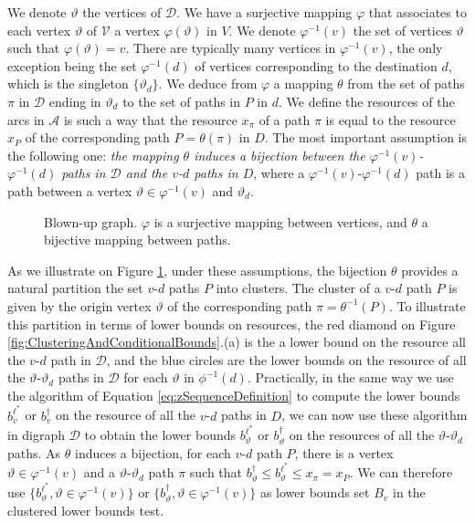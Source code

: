 \documentclass[11pt]{amsart}
\theoremstyle{plain}
\theoremstyle{remark}
\newcommand{\rleq}{\leqslant}
\newcommand{\re}{x}
\begin{document}
We denote  $\vartheta$ the vertices of $\mathcal{D}$. We have a surjective mapping $\varphi$ that associates to each vertex $\vartheta$ of $\mathcal{V}$ a vertex $\varphi(\vartheta)$ in $V$. We denote $\varphi^{-1}(v)$ the set of vertices $\vartheta$ such that $\varphi(\vartheta) = v$. There are typically many vertices in $\varphi^{-1}(v)$, the only exception being the set $\varphi^{-1}(d) $ of vertices corresponding to the destination $d$, which is the singleton $ \{\vartheta_{d}\}$. We deduce from $\varphi$ a mapping $\theta$ from the set of paths $\pi$ in $\mathcal{D}$ ending in $\vartheta_{d}$ to the set of paths in $P$ in $d$. We define the resources of the arcs in $\mathcal{A}$ is such a way that the resource $\re_{\pi}$ of a path $\pi$ is equal to the resource $\re_{P}$ of the corresponding path $P = \theta(\pi)$ in $D$. The most important assumption is the following one: \emph{the mapping $\theta$ induces a bijection between the $\varphi^{-1}(v)$-$\varphi^{-1}(d)$ paths in $\mathcal{D}$ and the $v$-$d$ paths in $D$}, where a $\varphi^{-1}(v)$-$\varphi^{-1}(d)$ path is a path between a vertex $\vartheta \in \varphi^{-1}(v)$ and $\vartheta_{d}$.


\begin{figure}[!ht]
	\begin{center}
		
		\caption{Blown-up graph. $\varphi$ is a surjective mapping between vertices, and $\theta$ a bijective mapping between paths.}
		\label{fig:stateGraph1}
	\end{center}
\end{figure} 

As we illustrate on Figure \ref{fig:stateGraph1}, under these assumptions, the bijection $\theta$ provides a natural partition the set $v$-$d$ paths $P$ into clusters. The cluster of a $v$-$d$ path $P$ is given by the origin vertex $\vartheta$ of the corresponding path $\pi = \theta^{-1}(P)$. To illustrate this partition in terms of lower bounds on resources, the red diamond on Figure \ref{fig:ClusteringAndConditionalBounds}.(a) is the a lower bound on the resource all the $v$-$d$ path in $\mathcal{D}$, and the blue circles are the lower bounds on the resource of all the $\vartheta$-$\vartheta_{d}$ paths in $\mathcal{D}$ for each $\vartheta$ in $\phi^{-1}(d)$. Practically, in the same way we use the algorithm of Equation \eqref{eq:zSequenceDefinition} to compute the lower bounds $b_{v}^{\ell^{*}}$ or $b_{v}^{\dagger}$ on the resource of all the $v$-$d$ paths in $D$, we can now use these algorithm in digraph $\mathcal{D}$ to obtain the lower bounds $b_{\vartheta}^{\ell^{*}}$ or $b_{\vartheta}^{\dagger}$ on the resources of all the $\vartheta$-$\vartheta_{d}$ paths. 
As $\theta$ induces a bijection, for each $v$-$d$ path $P$, there is a vertex $\vartheta \in \varphi^{-1}(v)$ and a $\vartheta$-$\vartheta_{d}$ path $\pi$ such that $b_{\vartheta}^{\dagger} \rleq b_{\vartheta}^{\ell^{*}} \rleq \re_{\pi} = \re_{P}$. We can therefore use $\{b_{\vartheta}^{\ell^{*}}, \vartheta \in \varphi^{-1}(v)\}$ or $\{b_{\vartheta}^{\dagger}, \vartheta \in \varphi^{-1}(v)\}$ as lower bounds set $B_{v}$ in the clustered lower bounds test.
\end{document}
